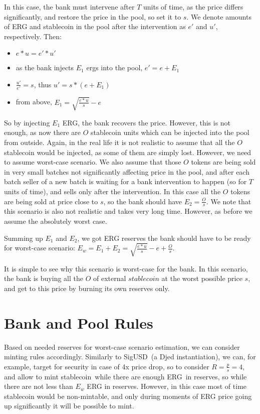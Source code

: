 \documentclass{article}   %
\newcommand{\bc}{ERG}
\newcommand{\sct}{stablecoin}
\begin{document}
In this case, the bank must intervene after $T$ units of time, as the price differs significantly, and restore the price in the pool, so set it to $s$. We denote amounts of \bc{} and \sct{} in the pool after the intervention as $e'$ and $u'$, respectively. Then:

\begin{itemize}
  \item{} $e * u = e' * u'$
  \item{} as the bank injects $E_1$ ergs into the pool, $e' = e + E_1$
  \item{} $\frac{u'}{e'} = s$, thus $u' = s * (e + E_1)$ 
  \item{} from above, $E_1 = \sqrt{\frac{e * u}{s}} - e$
\end{itemize}

So by injecting $E_1$ \bc{}, the bank recovers the price. However, this is not enough, as now there are $O$ \sct{} units which can be injected into the pool from outside. 
Again, in the real life it is not realistic to assume that all the $O$ \sct{} would be injected, as some of them are simply lost. However, we need to assume worst-case scenario. We also assume that those $O$ tokens are being sold in very small batches not significantly affecting price in the pool, and after each batch seller of a new batch is waiting for a bank intervention to happen (so for $T$ units of time), and sells only after the intervention. In this case all the $O$ tokens are being sold at price close to $s$, so the bank should have $E_2 = \frac{O}{s}$. We note that this scenario is also not realistic and takes very long time. However, as before we assume the absolutely worst case.

Summing up $E_1$ and $E_2$, we got \bc{} reserves the bank should have to be ready for worst-case scenario: $E_w = E_1 + E_2 = \sqrt{\frac{e * u}{s}} - e + \frac{O}{s}$.

It is simple to see why this scenario is worst-case for the bank. In this scenario, the bank is buying all the $O$ of external $\sct{}$ at the worst possible price $s$, and get to this price by burning its own reserves only.  

\section{Bank and Pool Rules}

Based on needed reserves for worst-case scenario estimation, we can consider minting rules accordingly. Similarly to SigUSD~(a Djed instantiation), we can, for example, target for security in case of 
4x price drop, so to consider $R = \frac{p}{s} = 4$, and allow to mint \sct{}~while there are enough \bc{}~in reserves, so while there are not less than $E_w$ \bc{} in reserves. However, in this case most of time \sct{} would be non-mintable, and only during moments of \bc{} price going up significantly it will be possible to mint. 
\end{document}
